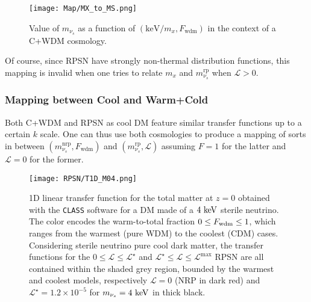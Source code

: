 \begin{figure}
\begin{center}
\texttt{[image: Map/MX\_to\_MS.png]}
\caption{Value of $m_{\nu_s}$ as a function of $\left( \mathrm{keV}/m_x, F_\mathrm{wdm} \right)$ in the context of a C+WDM cosmology.}
\label{fig:mx_ms_withF}
\end{center}
\end{figure}

Of course, since RPSN have strongly non-thermal distribution functions, this mapping is invalid when one tries to relate $m_x$ and $m_{\nu_s}^{\mathrm{rp}}$ when $\mathcal{L} > 0$.

\subsubsection{Mapping between Cool and Warm+Cold}
\label{sec:map_rpsn_cwdm}

Both C+WDM and RPSN as cool DM feature similar transfer functions up to a certain $k$ scale. One can thus use both cosmologies to produce a mapping of sorts in between $\left( m_{\nu_s}^{\mathrm{nrp}}, F_{\mathrm{wdm}} \right)$ and $\left( m_{\nu_s}^{\mathrm{rp}}, \mathcal{L} \right)$ assuming $F = 1$ for the latter and $\mathcal{L}=0$ for the former. \\ 

\begin{figure}
\begin{center}
\texttt{[image: RPSN/T1D\_M04.png]}
\caption{ 1D linear transfer function for the total matter at $z=0$ obtained with the \texttt{CLASS} software for a DM made of a $4~\rm{keV}$ sterile neutrino. The color encodes the warm-to-total fraction $0 \leq F_{\rm{wdm}} \leq 1$, which ranges from the warmest (pure WDM) to the coolest (CDM) cases. Considering sterile neutrino pure cool dark matter, the transfer functions for the $0 \leq \mathcal{L} \leq \mathcal{L}^\star$ and $\mathcal{L}^\star \leq \mathcal{L} \leq \mathcal{L}^{\mathrm{max}}$ RPSN are all contained within the shaded grey region, bounded by the warmest and coolest models, respectively $\mathcal{L}=0$ (NRP in dark red) and $\mathcal{L}^\star = 1.2 \times 10^{-5}$ for $m_{\nu_s} = 4~\rm{keV}$ in thick black. }
\label{fig:M4t1d}
\end{center}
\end{figure}

